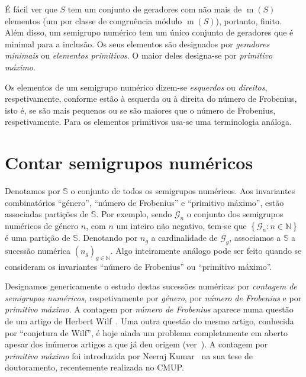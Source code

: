 \documentclass[12pt,a4paper]{article}
\numberwithin{table}{section}
\numberwithin{figure}{section}
\numberwithin{equation}{section}
\DeclareMathOperator{\multiplicityoper}{m} %
\DeclareMathOperator{\genusoper}{g} %
\DeclareMathOperator{\suchthat}{ : } %
\theoremstyle{definition}
\theoremstyle{remark}
\begin{document}

É fácil ver que \(S\) tem um conjunto de geradores com não mais de \(\multiplicityoper(S)\) elementos (um por classe de congruência módulo \(\multiplicityoper(S)\)), portanto, finito. Além disso, um semigrupo numérico tem um único conjunto de geradores que é minimal para a inclusão. Os seus elementos são designados por \emph{geradores minimais} ou \emph{elementos primitivos}. O maior deles designa-se por \emph{primitivo máximo}.

Os elementos de um semigrupo numérico dizem-se \emph{esquerdos} ou \emph{direitos}, respetivamente, conforme estão à esquerda ou à direita do número de Frobenius, isto é, se são mais pequenos ou se são maiores que o número de Frobenius, respetivamente. Para os elementos primitivos usa-se uma terminologia análoga.


\section{Contar semigrupos numéricos}\label{sec:contar}
Denotamos por \(\mathbb{S}\) o conjunto de todos os semigrupos numéricos.
Aos invariantes combinatórios ``género'', ``número de Frobenius'' e ``primitivo máximo'', estão associadas partições de \(\mathbb{S}\).
Por exemplo, sendo \(\mathcal{G}_n\) %
o conjunto dos semigrupos numéricos de género \(n\), com \(n\) um inteiro não negativo, tem-se que \(\left\{\mathcal{G}_n\suchthat n\in \mathbb{N}\right\}\) é uma partição de \(\mathbb{S}\). Denotando por \(n_g\) a cardinalidade de \(\mathcal{G}_g\), %
associamos a \(\mathbb{S}\) a sucessão numérica \(\left(n_g\right)_{g\in\mathbb{N}}\). Algo inteiramente análogo pode ser feito quando se consideram os invariantes ``número de Frobenius'' ou ``primitivo máximo''.  


Designamos genericamente o estudo destas sucessões numéricas por \emph{contagem de semigrupos numéricos}, respetivamente por \emph{género}, por \emph{número de Frobenius} e por \emph{primitivo máximo}.
A contagem por \emph{número de Frobenius} aparece numa questão de um artigo de Herbert Wilf~\cite{Wilf1978AMM-circle}. Uma outra questão do mesmo artigo, conhecida por ``conjetura de Wilf'', é hoje ainda um problema completamente em aberto apesar dos inúmeros artigos a que já deu origem (ver~\cite{Delgado2020-survey}).  
A contagem por \emph{primitivo máximo} foi introduzida por Neeraj Kumar~\cite{Kumar2025phd-Numerical} na sua tese de doutoramento, recentemente realizada no CMUP.
\end{document}
